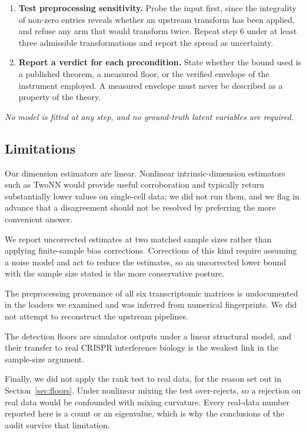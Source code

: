 \documentclass[journal,twoside,web]{ieeecolor}
\begin{document}
\begin{algorithm}[!t]
\begin{enumerate}
full rank, report the Marchenko--Pastur edge crossing for a matched-shape
noise matrix. Where it is not, state that the comparison is unavailable rather
than reporting the value it returns.
\item \textbf{Test preprocessing sensitivity.} Probe the input first, since
the integrality of non-zero entries reveals whether an upstream transform has
been applied, and refuse any arm that would transform twice. Repeat step 6
under at least three admissible transformations and report the spread as
uncertainty.
\item \textbf{Report a verdict for each precondition.} State whether the bound
used is a published theorem, a measured floor, or the verified envelope of the
instrument employed. A measured envelope must never be described as a property
of the theory.
\end{enumerate}
\textit{No model is fitted at any step, and no ground-truth latent variables
are required.}
\end{algorithm}

\subsection{Limitations}
Our dimension estimators are linear. Nonlinear intrinsic-dimension estimators
such as TwoNN would provide useful corroboration and typically return
substantially lower values on single-cell data; we did not run them, and we
flag in advance that a disagreement should not be resolved by preferring the
more convenient answer.

We report uncorrected estimates at two matched sample sizes rather than
applying finite-sample bias corrections. Corrections of this kind require
assuming a noise model and act to reduce the estimates, so an uncorrected
lower bound with the sample size stated is the more conservative posture.

The preprocessing provenance of all six transcriptomic matrices is
undocumented in the loaders we examined and was inferred from numerical
fingerprints. We did not attempt to reconstruct the upstream pipelines.

The detection floors are simulator outputs under a linear structural model,
and their transfer to real CRISPR interference biology is the weakest link in
the sample-size argument.

Finally, we did not apply the rank test to real data, for the reason set out
in Section~\ref{sec:floors}. Under nonlinear mixing the test over-rejects, so
a rejection on real data would be confounded with mixing curvature. Every
real-data number reported here is a count or an eigenvalue, which is why the
conclusions of the audit survive that limitation.
\end{document}
